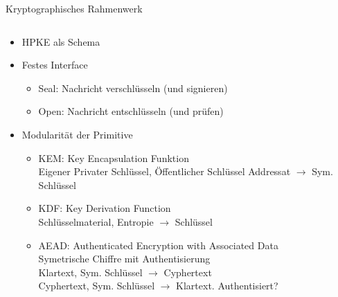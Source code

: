 \begin{frame}[c]{Kryptographisches Rahmenwerk}
  \begin{columns}[fullwidth,c]
    \begin{column}{.65\linewidth}
      \begin{itemize}
        \item HPKE als Schema

        \item Festes Interface
        \begin{itemize}
          \item Seal: Nachricht verschlüsseln (und signieren)
          \item Open: Nachricht entschlüsseln (und prüfen)
        \end{itemize}

        \item Modularität der Primitive
        \begin{itemize}
          \item KEM: Key Encapsulation Funktion\\Eigener Privater Schlüssel, Öffentlicher Schlüssel Addressat $\rightarrow$ Sym. Schlüssel
          \item KDF: Key Derivation Function\\Schlüsselmaterial, Entropie $\rightarrow$ Schlüssel
          \item AEAD: Authenticated Encryption with Associated Data\\
            Symetrische Chiffre mit Authentisierung\\
            Klartext, Sym. Schlüssel $\rightarrow$ Cyphertext\\
            Cyphertext, Sym. Schlüssel $\rightarrow$ Klartext. Authentisiert?
        \end{itemize}

      \end{itemize}
    \end{column}%
    \begin{column}{.35\linewidth}
      

\end{column}
\end{columns}
\end{frame}
